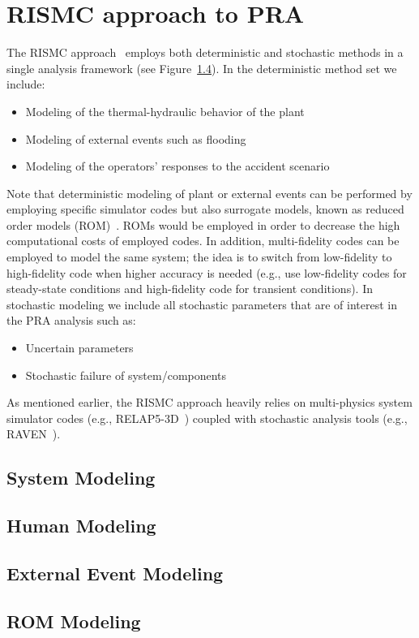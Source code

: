 \section{RISMC approach to PRA}
\label{sec:rismc}
The RISMC approach~\cite{RISMC} employs both deterministic and stochastic methods 
in a single analysis framework (see Figure~\ref{}). In the deterministic method 
set we include:
\begin{itemize}
  \item Modeling of the thermal-hydraulic behavior of the plant~\cite{BWR_SBO_Mandelli,BWRanalysis}
  \item Modeling of external events such as flooding~\cite{mandelliPSA2015}
  \item Modeling of the operators’ responses to the accident scenario~\cite{HRA_BoringReport2014}
\end{itemize}

Note that deterministic modeling of plant or external events can be performed by employing 
specific simulator codes but also surrogate models, known as reduced order models (ROM)~\cite{ROM_Khalik}. 
ROMs would be employed in order to decrease the high computational costs of employed codes.
In addition, multi-fidelity codes can be employed to model the same system; the idea is to 
switch from low-fidelity to high-fidelity code when higher accuracy is needed (e.g., use 
low-fidelity codes for steady-state conditions and high-fidelity code for transient conditions).
In stochastic modeling we include all stochastic parameters that are of interest in the PRA 
analysis such as:
\begin{itemize}
  \item Uncertain parameters
  \item Stochastic failure of system/components
\end{itemize}
As mentioned earlier, the RISMC approach heavily relies on multi-physics system simulator 
codes (e.g., RELAP5-3D~\cite{relap5}) coupled with stochastic analysis tools (e.g., RAVEN~\cite{RAVEN_PSAM_2014}). 

\subsection{System Modeling}

\subsection{Human Modeling}

\subsection{External Event Modeling}

\subsection{ROM Modeling}
